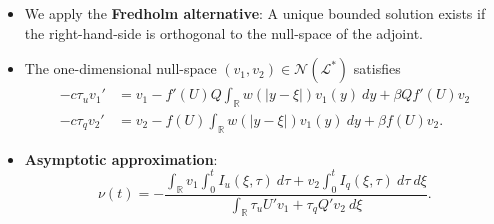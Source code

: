 \documentclass[landscape,final]{baposter}
\newcommand{\RR}{\mathbb{R}}
\newcommand{\LL}{\mathcal{L}}
\begin{document}
\begin{poster}
{\begin{itemize}
\begin{align*}
		\begin{bmatrix}\phi \\ \psi \end{bmatrix}
		\end{align*}
		\item We apply the \textbf{Fredholm alternative}: A unique bounded solution exists if the right-hand-side is orthogonal to the null-space of the adjoint.
		\item The one-dimensional null-space $(v_1, v_2) \in \mathcal{N}(\LL^*)$ satisfies
		\begin{align*}
	    	-c \tau_u v_1' &= v_1 -f'(U)Q \int_\RR w(|y-\xi|) v_1(y) \ dy + \beta Q f'(U)v_2 \\
	    	-c \tau_q v_2' &= v_2 - f(U) \int_\RR w(|y-\xi|) v_1(y) \ dy + \beta f(U) v_2.
		\end{align*}
		\item \textbf{Asymptotic approximation}:
		 \[
	 		\nu(t) = - \frac{\int_\RR v_1 \int_0^t I_u(\xi, \tau) \ d\tau + v_2 \int_0^t I_q(\xi, \tau) \ d\tau \ d\xi}{\int_\RR \tau_u U' v_1 + \tau_q Q' v_2 \ d\xi}.
	 	\]
	\end{itemize}
	
	\vspace{.2cm}
}


\end{poster}
\end{document}
